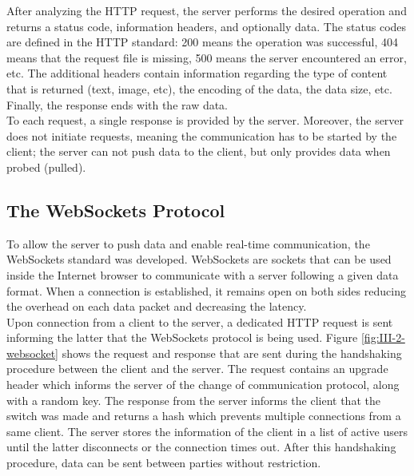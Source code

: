       After analyzing the HTTP request, the server performs the desired operation and returns a status code, information headers, and optionally data. The status codes are defined in the HTTP standard: 200 means the operation was successful, 404 means that the request file is missing, 500 means the server encountered an error, etc. The additional headers contain information regarding the type of content that is returned (text, image, etc), the encoding of the data, the data size, etc. Finally, the response ends with the raw data. \\

      To each request, a single response is provided by the server. Moreover, the server does not initiate requests, meaning the communication has to be started by the client; the server can not push data to the client, but only provides data when probed (pulled).

    \subsection{The WebSockets Protocol}

      To allow the server to push data and enable real-time communication, the WebSockets standard was developed. WebSockets are sockets that can be used inside the Internet browser to communicate with a server following a given data format. When a connection is established, it remains open on both sides reducing the overhead on each data packet and decreasing the latency. \\

      Upon connection from a client to the server, a dedicated HTTP request is sent informing the latter that the WebSockets protocol is being used. Figure \ref{fig:III-2-websocket} shows the request and response that are sent during the handshaking procedure between the client and the server. The request contains an upgrade header which informs the server of the change of communication protocol, along with a random key. The response from the server informs the client that the switch was made and returns a hash which prevents multiple connections from a same client. The server stores the information of the client in a list of active users until the latter disconnects or the connection times out. After this handshaking procedure, data can be sent between parties without restriction.

